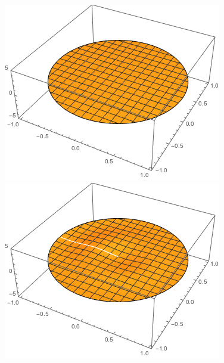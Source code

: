 \documentclass{paper}
\begin{document}
\begin{figure}[!htb]
      \includegraphics[width=\linewidth]{images/waves1.png}
    \endminipage\hfill
      \includegraphics[width=\linewidth]{images/waves2.png}
    \endminipage\hfill

\end{figure}
\end{document}
